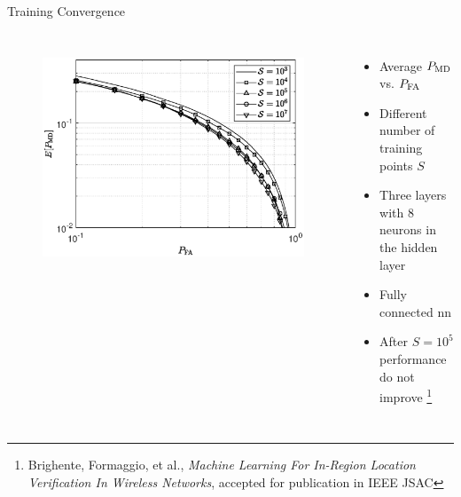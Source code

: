 \documentclass[10pt]{beamer}
\begin{document}
\begin{frame}{Training Convergence}
\begin{columns}
\begin{figure}[]
\centering
\includegraphics[width=1\columnwidth]{res_avg_nTrain.eps}
\label{fig:n_train}
\end{figure}
\begin{itemize}
\item Average $P_{\rm MD}$ vs. $P_{\rm FA}$
\item Different number of training points $S$
\item Three layers with $8$ neurons in the hidden layer
\item Fully connected \ac{nn}
\item After $S=10^5$ performance do not improve \footnote[frame]{Brighente, Formaggio, et al., \textit{Machine Learning For In-Region Location Verification In Wireless Networks}, accepted for publication in IEEE JSAC}
\end{itemize}
\end{columns}
\end{frame}
\end{document}

